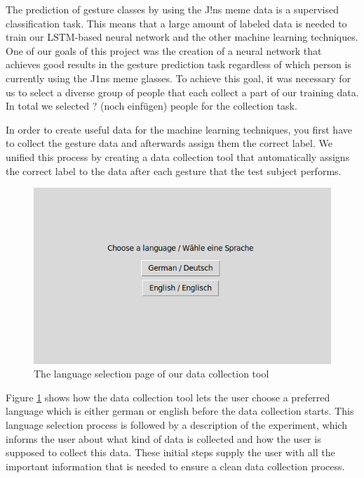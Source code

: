 \documentclass[runningheads]{llncs}
\begin{document}
The prediction of gesture classes by using the J!ns meme data is a supervised classification task. This means that a large amount of labeled data is needed to train our LSTM-based neural network and the other machine learning techniques. One of our goals of this project was the creation of a neural network that achieves good results in the gesture prediction task regardless of which person is currently using the J1ns meme glasses. To achieve this goal, it was necessary for us to select a diverse group of people that each collect a part of our training data. In total we selected ? (noch einfügen) people for the collection task.
\par
In order to create useful data for the machine learning techniques, you first have to collect the gesture data and afterwards assign them the correct label. We unified this process by creating a data collection tool that automatically assigns the correct label to the data after each gesture that the test subject performs.
\begin{figure}
\centering
\centerline{\includegraphics[scale=0.5]{Language_Selection.png}}
\caption{The language selection page of our data collection tool}
\label{fig:gesturestart}
\end{figure}
Figure \ref{fig:gesturestart} shows how the data collection tool lets the user choose a preferred language which is either german or english before the data collection starts. This language selection process is followed by a description of the experiment, which informs the user about what kind of data is collected and how the user is supposed to collect this data. These initial steps supply the user with all the important information that is needed to ensure a clean data collection process.
\par
\end{document}
